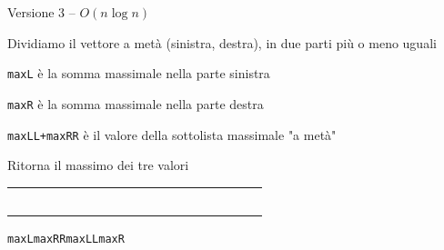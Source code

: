 \begin{frame}[fragile]{Versione 3 -- $O(n \log n)$}

\vspace{-9pt}
\begin{myboxtitle}
\BIL
\item Dividiamo il vettore a metà (sinistra, destra), in due parti più o meno uguali
\item \texttt{maxL} è la somma massimale nella parte sinistra
\item \texttt{maxR} è la somma massimale nella parte destra
\item \texttt{maxLL+maxRR} è il valore della sottolista massimale "a metà"
\item Ritorna il massimo dei tre valori
\EIL
\end{myboxtitle}

\begin{center}
\begingroup
\LARGE
\begin{tabular}{!{\vrule width 1.5pt}p{0.30cm}|p{0.30cm}|p{0.30cm}|p{0.30cm}|p{0.30cm}|p{0.30cm}|p{0.30cm}|p{0.30cm}!{\vrule width 1.5pt}p{0.30cm}|p{0.30cm}|p{0.30cm}|p{0.30cm}|p{0.30cm}|p{0.30cm}|p{0.30cm}|p{0.30cm}!{\vrule width 1.5pt}}
~~&&&&&~~&&&&&&~~&~~&&&\\
\end{tabular}
\endgroup
\end{center}
\Large
\hspace*{1.7cm}\texttt{maxL}\hspace*{1.9cm}\texttt{maxRR\quad maxLL}\hspace*{2.8cm}\texttt{maxR}

\end{frame}

